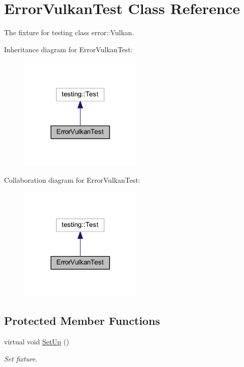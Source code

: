 \hypertarget{class_error_vulkan_test}{}\section{Error\+Vulkan\+Test Class Reference}
\label{class_error_vulkan_test}


The fixture for testing class error\+::\+Vulkan.  




Inheritance diagram for Error\+Vulkan\+Test\+:
\nopagebreak
\begin{figure}[H]
\begin{center}
\leavevmode
\includegraphics[width=167pt]{class_error_vulkan_test__inherit__graph}
\end{center}
\end{figure}


Collaboration diagram for Error\+Vulkan\+Test\+:
\nopagebreak
\begin{figure}[H]
\begin{center}
\leavevmode
\includegraphics[width=167pt]{class_error_vulkan_test__coll__graph}
\end{center}
\end{figure}
\subsection*{Protected Member Functions}
\begin{DoxyCompactItemize}
\item 
\hypertarget{class_error_vulkan_test_a5ae9d99b5e62289e47e4e7af7ab334ab}{}\label{class_error_vulkan_test_a5ae9d99b5e62289e47e4e7af7ab334ab} 
virtual void \hyperlink{class_error_vulkan_test_a5ae9d99b5e62289e47e4e7af7ab334ab}{Set\+Up} ()
\begin{DoxyCompactList}\small\item\em Set fixture. \end{DoxyCompactList}\end{DoxyCompactItemize}
